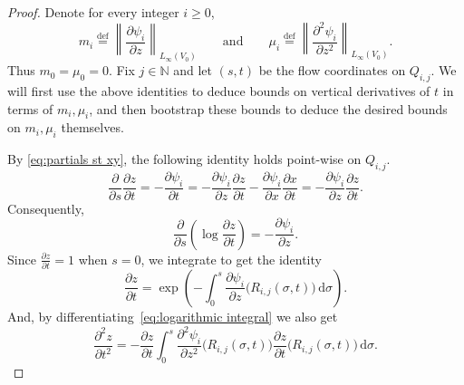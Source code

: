 \documentclass[11pt,reqno]{amsart}
\newcommand{\N}{\mathbb{N}}
\newcommand{\ud}[0]{\,\mathrm{d}}
\newcommand{\0}{\mathbf{0}}
\renewcommand{\1}{\mathbf 1}
\newcommand{\eqdef}{\stackrel{\mathrm{def}}{=}}
\renewcommand{\ge}{\geqslant}
\theoremstyle{remark}
\newcommand{\pd}[2]{\frac{\partial #2}{\partial #1}}
\begin{document}
\begin{proof} Denote for every integer $i\ge 0$,
\begin{equation}\label{eq:def m_i,mu_i}
m_i\eqdef \left\|\frac{\partial \psi_{i}}{\partial z}\right\|_{L_\infty(V_0)}\qquad\mathrm{and}\qquad \mu_i\eqdef \left\|\frac{\partial^2 \psi_{i}}{\partial z^2}\right\|_{L_\infty(V_0)}.
\end{equation}
Thus $m_0=\mu_0=0$. Fix $j\in \N$ and let $(s,t)$ be the flow coordinates on $Q_{i,j}$. We will first use the above identities to deduce bounds on vertical derivatives of $t$ in terms of $m_i,\mu_i$, and then bootstrap these bounds to deduce the desired bounds on $m_i,\mu_i$ themselves.

By \eqref{eq:partials st xy}, the following identity holds point-wise on $Q_{i,j}$.
$$\frac{\partial}{\partial s}\frac{\partial z}{\partial t}=-\frac{\partial \psi_i}{\partial t} = -\frac{\partial \psi_i}{\partial z}\frac{\partial z}{\partial t}-\frac{\partial \psi_i}{\partial x}\frac{\partial x}{\partial t}=-\frac{\partial \psi_i}{\partial z}\frac{\partial z}{\partial t}.
$$
  Consequently,
$$\pd{s}{}\left(\log \pd{t}{z}\right)=-\pd{z}{\psi_i}.$$
  Since $\pd{t}{z}=1$ when $s=0$, we integrate to get the identity
        \begin{equation}\label{eq:logarithmic integral}\frac{\partial z}{\partial t}=\exp \left(-\int_0^{s} \frac{\partial \psi_i}{\partial z} \big(R_{i,j}(\sigma, t)\big) \ud \sigma\right).\end{equation}
    And, by differentiating~\eqref{eq:logarithmic integral} we also get
          \begin{equation}\label{eq:logarithmic integral2}\frac{\partial^2 z}{\partial t^2}=-\frac{\partial z}{\partial t}\int_0^{s} \frac{\partial^2 \psi_i}{\partial z^2} \big(R_{i,j}(\sigma, t)\big) \frac{\partial z}{\partial t} \big(R_{i,j}(\sigma, t)\big)\ud \sigma.\end{equation}


\end{proof}
\end{document}
